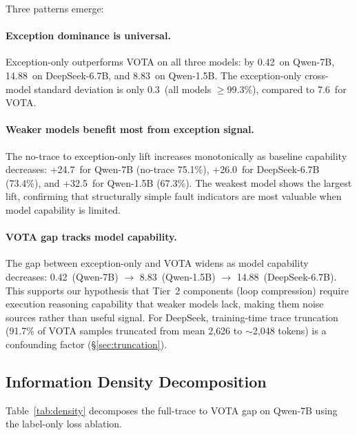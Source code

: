 \documentclass[11pt]{article}
\newcommand{\pp}{\,\text{pp}}
\begin{document}
Three patterns emerge:

\paragraph{Exception dominance is universal.}
Exception-only outperforms VOTA on all three models: by 0.42\pp{} on Qwen-7B, 14.88\pp{} on DeepSeek-6.7B, and 8.83\pp{} on Qwen-1.5B.
The exception-only cross-model standard deviation is only 0.3\pp{} (all models $\geq$99.3\%), compared to 7.6\pp{} for VOTA.

\paragraph{Weaker models benefit most from exception signal.}
The no-trace to exception-only lift increases monotonically as baseline capability decreases: +24.7\pp{} for Qwen-7B (no-trace 75.1\%), +26.0\pp{} for DeepSeek-6.7B (73.4\%), and +32.5\pp{} for Qwen-1.5B (67.3\%).
The weakest model shows the largest lift, confirming that structurally simple fault indicators are most valuable when model capability is limited.

\paragraph{VOTA gap tracks model capability.}
The gap between exception-only and VOTA widens as model capability decreases: 0.42\pp{} (Qwen-7B) $\rightarrow$ 8.83\pp{} (Qwen-1.5B) $\rightarrow$ 14.88\pp{} (DeepSeek-6.7B).
This supports our hypothesis that Tier~2 components (loop compression) require execution reasoning capability that weaker models lack, making them noise sources rather than useful signal.
For DeepSeek, training-time trace truncation (91.7\% of VOTA samples truncated from mean 2{,}626 to ${\sim}$2{,}048 tokens) is a confounding factor (\S\ref{sec:truncation}).

\subsection{Information Density Decomposition}
\label{sec:info_density}

Table~\ref{tab:density} decomposes the full-trace to VOTA gap on Qwen-7B using the label-only loss ablation.
\end{document}
